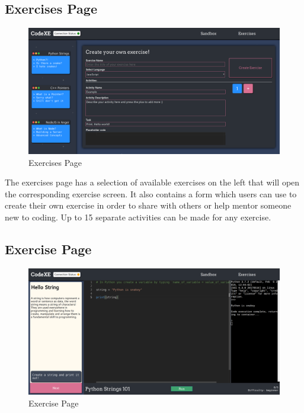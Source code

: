 \subsection{Exercises Page} \label{impl-exercises-page}

\begin{figure}[h!]
    \centering
    \includegraphics[width=\linewidth]{res/exercises_page.png}
    \caption{Exercises Page}
    \label{fig:exercisespage}
\end{figure}

The exercises page has a selection of available exercises on the left that will open the corresponding exercise screen. It also contains a form which users can use to create their own exercise in order to share with others or help mentor someone new to coding. Up to 15 separate activities can be made for any exercise.

\subsection{Exercise Page} \label{impl-exercise-page}

\begin{figure}[h!]
\centering
    \includegraphics[width=\linewidth]{res/exercise_page.png}
    \caption{Exercise Page}
    \label{fig:exercisepage}
\end{figure}

